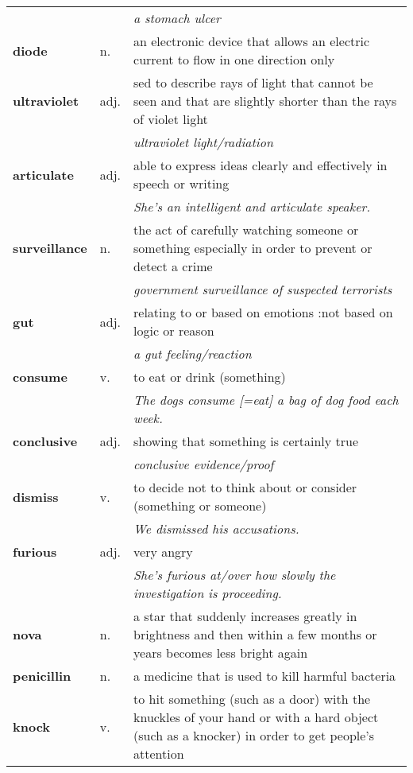 \documentclass[a4paper]{article}
\begin{document}
\begin{longtable}{llp{11cm}}
 & & \textit{a stomach ulcer}\\[0.08cm]
\textbf{diode} & n. &  an electronic device that allows an electric current to flow in one direction only\\[0.08cm]
\textbf{ultraviolet} & adj. &  sed to describe rays of light that cannot be seen and that are slightly shorter than the rays of violet light \\
 & & \textit{ultraviolet light/radiation}\\[0.08cm]
\textbf{articulate} & adj. &  able to express ideas clearly and effectively in speech or writing \\
 & & \textit{She's an intelligent and articulate speaker.}\\[0.08cm]
\textbf{surveillance} & n. &  the act of carefully watching someone or something especially in order to prevent or detect a crime \\
 & & \textit{government surveillance of suspected terrorists}\\[0.08cm]
\textbf{gut} & adj. &  relating to or based on emotions :not based on logic or reason \\
 & & \textit{a gut feeling/reaction}\\[0.08cm]
\textbf{consume} & v. &  to eat or drink (something) \\
 & & \textit{The dogs consume [=eat] a bag of dog food each week.}\\[0.08cm]
\textbf{conclusive} & adj. &  showing that something is certainly true \\
 & & \textit{conclusive evidence/proof}\\[0.08cm]
\textbf{dismiss} & v. &  to decide not to think about or consider (something or someone) \\
 & & \textit{We dismissed his accusations.}\\[0.08cm]
\textbf{furious} & adj. &  very angry \\
 & & \textit{She's furious at/over how slowly the investigation is proceeding.}\\[0.08cm]
\textbf{nova} & n. &  a star that suddenly increases greatly in brightness and then within a few months or years becomes less bright again \\[0.08cm]
\textbf{penicillin} & n. &  a medicine that is used to kill harmful bacteria\\[0.08cm]
\textbf{knock} & v. &  to hit something (such as a door) with the knuckles of your hand or with a hard object (such as a knocker) in order to get people's attention \\

\end{longtable}
\end{document}

